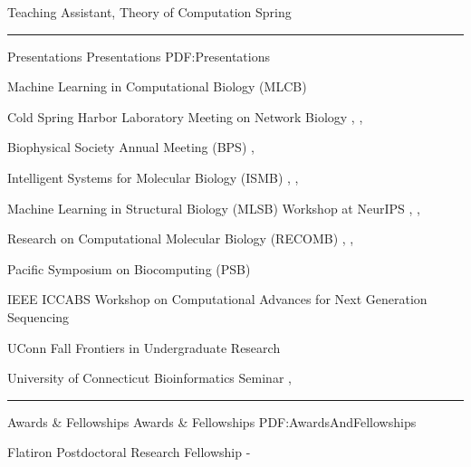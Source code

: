 \documentclass[letterpaper,MMMyyyy,nonstopmode]{simpleresumecv}
\begin{document}
\begin{Body}
\Gap
\Item Teaching Assistant, Theory of Computation
\hfill
Spring 


\BigGap
\hrule
\Section
{Presentations}
{Presentations}
{PDF:Presentations}

\Entry
{Machine Learning in Computational Biology (MLCB)}
\hfill
{}
\Gap

\Entry
{Cold Spring Harbor Laboratory Meeting on Network Biology}
\hfill
{}, , 
\Gap

\Entry
{Biophysical Society Annual Meeting (BPS)}
\hfill
{}, 
\Gap

\Entry
{Intelligent Systems for Molecular Biology (ISMB)}
\hfill
{}, , 
\Gap

\Entry
{Machine Learning in Structural Biology (MLSB) Workshop at NeurIPS}
\hfill
{}, , 
\Gap

\Entry
{Research on Computational Molecular Biology (RECOMB)}
\hfill
{}, , 
\Gap

\Entry
{Pacific Symposium on Biocomputing (PSB)}
\hfill
{}
\Gap

\Entry
{IEEE ICCABS Workshop on Computational Advances for Next Generation Sequencing}
\hfill
{}
\Gap

\Entry
{UConn Fall Frontiers in Undergraduate Research}
\hfill
{}
\Gap

\Entry
{University of Connecticut Bioinformatics Seminar}
\hfill
{}, 

\BigGap
\hrule
\Section
{Awards \&\newline
Fellowships}
{Awards \& Fellowships}
{PDF:AwardsAndFellowships}

\Entry
{Flatiron Postdoctoral Research Fellowship}
\hfill
{} - 
\Gap


\end{Body}
\end{document}
